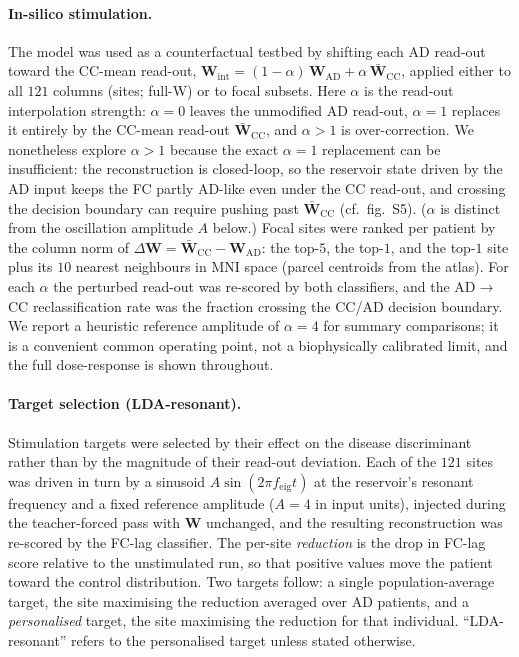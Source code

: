 \documentclass[11pt]{article}
\begin{document}
\paragraph{In-silico stimulation.}
The model was used as a counterfactual testbed by shifting each AD read-out
toward the CC-mean read-out,
$\mathbf{W}_{\mathrm{int}} = (1-\alpha)\,\mathbf{W}_{\mathrm{AD}}
 + \alpha\,\bar{\mathbf{W}}_{\mathrm{CC}}$, applied either to all $121$ columns
(sites; full-W) or to focal subsets. Here $\alpha$ is the read-out interpolation
strength: $\alpha=0$ leaves the unmodified AD read-out, $\alpha=1$ replaces it
entirely by the CC-mean read-out $\bar{\mathbf{W}}_{\mathrm{CC}}$, and $\alpha>1$
is over-correction. We nonetheless explore $\alpha>1$ because the exact $\alpha=1$
replacement can be insufficient: the reconstruction is closed-loop, so the
reservoir state driven by the AD input keeps the FC partly AD-like even under the
CC read-out, and crossing the decision boundary can require pushing past
$\bar{\mathbf{W}}_{\mathrm{CC}}$ (cf.\ fig.~S5). ($\alpha$ is distinct from the
oscillation amplitude $A$ below.) Focal sites were ranked per patient by the
column norm of $\Delta\mathbf{W}=\bar{\mathbf{W}}_{\mathrm{CC}}-
\mathbf{W}_{\mathrm{AD}}$: the top-$5$, the top-$1$, and the top-$1$ site plus
its $10$ nearest neighbours in MNI space (parcel centroids from the atlas). For
each $\alpha$ the perturbed read-out was re-scored by both classifiers, and the
AD$\rightarrow$CC reclassification rate was the fraction crossing the CC/AD
decision boundary. We report a heuristic reference amplitude of $\alpha=4$ for
summary comparisons; it is a convenient common operating point, not a
biophysically calibrated limit, and the full dose-response is shown throughout.

\paragraph{Target selection (LDA-resonant).}
Stimulation targets were selected by their effect on the disease discriminant
rather than by the magnitude of their read-out deviation. Each of the $121$ sites
was driven in turn by a sinusoid $A\sin(2\pi f_{\mathrm{eig}}t)$ at the
reservoir's resonant frequency and a fixed reference amplitude ($A=4$ in input
units), injected during the teacher-forced pass with $\mathbf{W}$ unchanged, and
the resulting reconstruction was re-scored by the FC-lag classifier. The per-site
\emph{reduction} is the drop in FC-lag score relative to the unstimulated run, so
that positive values move the patient toward the control distribution. Two
targets follow: a single population-average target, the site maximising the
reduction averaged over AD patients, and a \emph{personalised} target, the site
maximising the reduction for that individual. ``LDA-resonant'' refers to the
personalised target unless stated otherwise.
\end{document}
